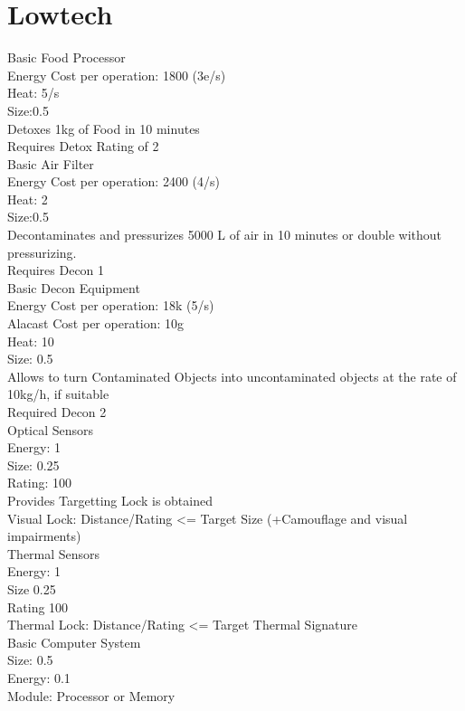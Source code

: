 \section{Lowtech}\label{sec:lowtech}
Basic Food Processor\\
Energy Cost per operation: 1800 (3e/s)\\
Heat: 5/s \\
Size:0.5\\
Detoxes 1kg of Food in 10 minutes \\
Requires Detox Rating of 2\\
\newline
Basic Air Filter\\
Energy Cost per operation: 2400 (4/s)\\
Heat: 2\\
Size:0.5\\
Decontaminates and pressurizes 5000 L of air in  10 minutes or double without pressurizing. \\
Requires Decon 1\\
\newline
Basic Decon Equipment \\
Energy Cost per operation: 18k (5/s)\\
Alacast Cost per operation: 10g\\
Heat: 10 \\
Size: 0.5\\
Allows to turn Contaminated Objects into uncontaminated objects at the rate of 10kg/h, if suitable\\
Required Decon 2\\
\newline
Optical Sensors\\
Energy: 1\\
Size: 0.25 \\
Rating: 100\\
Provides Targetting Lock is obtained\\
Visual Lock: Distance/Rating <= Target Size (+Camouflage and visual impairments)\\
\newline
Thermal Sensors\\
Energy: 1\\
Size 0.25\\
Rating 100\\
Thermal Lock: Distance/Rating <= Target Thermal Signature\\
\newline
Basic Computer System\\
Size: 0.5\\
Energy: 0.1\\
Module: Processor or Memory\\
\newline
